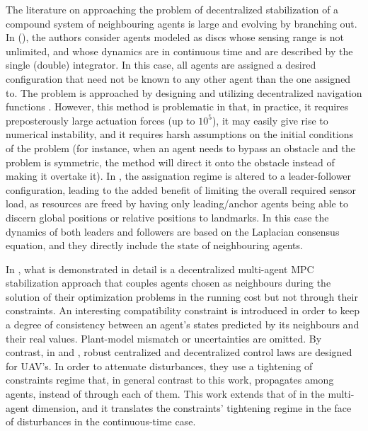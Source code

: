 The literature on approaching the problem of decentralized stabilization of a
compound system of neighbouring agents is large and evolving by branching out.
In \cite{1470732} (\cite{00207170600867123}), the authors consider agents modeled
as discs whose sensing range is not unlimited, and whose dynamics are in
continuous time and are described by the single (double) integrator. In this case,
all agents are assigned a desired configuration that need not be known to
any other agent than the one assigned to. The problem is approached by
designing and utilizing decentralized navigation functions \cite{Lav06}.
However, this method is problematic in that, in practice, it requires
preposterously large actuation forces (up to $10^5$), it may easily give rise to
numerical instability, and it requires harsh assumptions on the initial
conditions of the problem (for instance, when an agent needs to bypass an
obstacle and the problem is symmetric, the method will direct it onto the
obstacle instead of making it overtake it). In \cite{Gustavi2010133}, the
assignation regime is altered to a leader-follower configuration, leading to the
added benefit of limiting the overall required sensor load, as resources are freed
by having only leading/anchor agents being able to discern global positions or
relative positions to landmarks.  In this case the dynamics of both leaders and
followers are based on the Laplacian consensus equation, and they directly
include the state of neighbouring agents.

In \cite{Dunbar2006549}, what is demonstrated in detail is a decentralized
multi-agent MPC stabilization approach that couples agents chosen as neighbours
during the solution of their optimization problems in the running cost but not
through their constraints. An interesting compatibility constraint is introduced
in order to keep a degree of consistency between an agent's states predicted by
its neighbours and their real values. Plant-model mismatch or uncertainties are
omitted.  By contrast, in \cite{1383977} and \cite{1429425}, robust centralized
and decentralized control laws are designed for UAV's. In order to attenuate
disturbances, they use a tightening of constraints regime that, in general
contrast to this work, propagates among agents, instead of through each of them.
This work extends that of \cite{1185106} in the multi-agent dimension,
and it translates the constraints' tightening regime in the face of disturbances
in the continuous-time case. \\[1ex]

